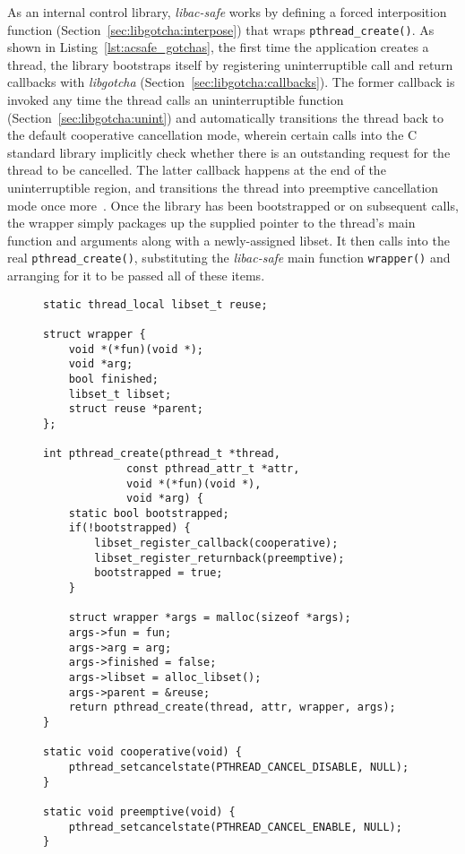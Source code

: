 As an internal control library, \textit{libac-safe} works by defining a forced
interposition function (Section~\ref{sec:libgotcha:interpose}) that wraps
\texttt{pthread\_create()}.  As shown in Listing~\ref{lst:acsafe_gotchas}, the first
time the application creates a thread, the library bootstraps itself by registering
uninterruptible call and return callbacks with \textit{libgotcha}
(Section~\ref{sec:libgotcha:callbacks}).  The former callback is invoked any time the
thread calls an uninterruptible function (Section~\ref{sec:libgotcha:unint}) and
automatically transitions the thread back to the default cooperative cancellation
mode, wherein certain calls into the C standard library implicitly check whether
there is an outstanding request for the thread to be cancelled.  The latter callback
happens at the end of the uninterruptible region, and transitions the thread into
preemptive cancellation mode once more~\cite{pthreadsetcanceltype-manpage}.  Once the
library has been bootstrapped or on subsequent calls, the wrapper simply packages up
the supplied pointer to the thread's main function and arguments along with a
newly-assigned libset.  It then calls into the real \texttt{pthread\_create()},
substituting the \textit{libac-safe} main function \texttt{wrapper()} and arranging
for it to be passed all of these items.

\begin{figure}[p]
\begin{leftfullpage}
\begin{lstlisting}[label=lst:acsafe_gotchas,caption=\textit{libac-safe}'s \texttt{pthread\_create()} replacement and control library callbacks,morekeywords=thread_local]
static thread_local libset_t reuse;

struct wrapper {
	void *(*fun)(void *);
	void *arg;
	bool finished;
	libset_t libset;
	struct reuse *parent;
};

int pthread_create(pthread_t *thread,
		     const pthread_attr_t *attr,
		     void *(*fun)(void *),
		     void *arg) {
	static bool bootstrapped;
	if(!bootstrapped) {
		libset_register_callback(cooperative);
		libset_register_returnback(preemptive);
		bootstrapped = true;
	}

	struct wrapper *args = malloc(sizeof *args);
	args->fun = fun;
	args->arg = arg;
	args->finished = false;
	args->libset = alloc_libset();
	args->parent = &reuse;
	return pthread_create(thread, attr, wrapper, args);
}

static void cooperative(void) {
	pthread_setcancelstate(PTHREAD_CANCEL_DISABLE, NULL);
}

static void preemptive(void) {
	pthread_setcancelstate(PTHREAD_CANCEL_ENABLE, NULL);
}
\end{lstlisting}
\end{leftfullpage}
\end{figure}

